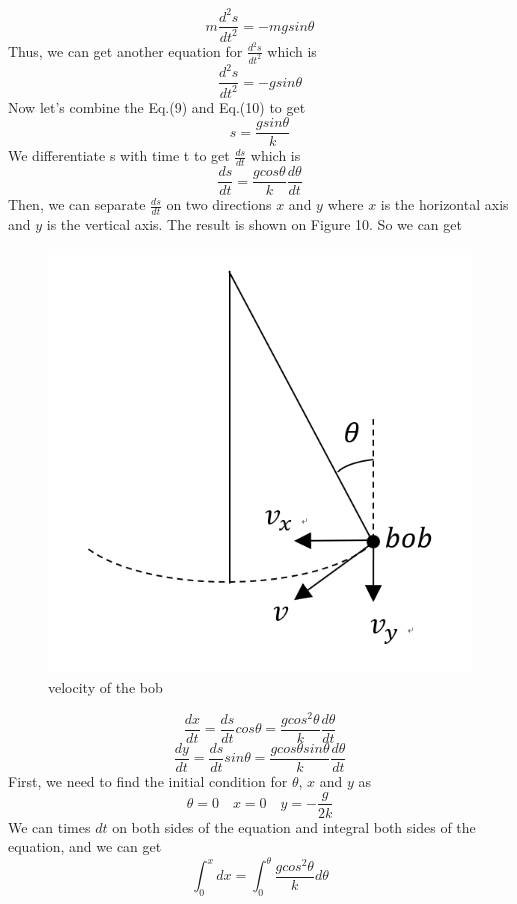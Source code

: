 \documentclass[12pt,a4paper]{article}
\begin{document}
$$m\frac{d^2s}{dt^2} = -mgsin\theta$$
Thus, we can get another equation for $\frac{d^2s}{dt^2}$ which is
\begin{equation}
    \frac{d^2s}{dt^2} = -gsin\theta
\end{equation}
Now let's combine the Eq.(9) and Eq.(10) to get
$$s = \frac{gsin\theta}{k}$$
We differentiate s with time t to get $\frac{ds}{dt}$ which is
$$\frac{ds}{dt} = \frac{gcos\theta}{k}\frac{d\theta}{dt}$$
Then, we can separate $\frac{ds}{dt}$ on two directions $x$ and $y$ where $x$ is the horizontal axis and $y$ is the vertical axis. The result is shown on Figure 10. So we can get
\begin{figure}[!htbp]
    \centering
    \includegraphics[scale=0.35]{2.png}
    \caption{velocity of the bob}
    \label{velocity}
\end{figure}
$$\frac{dx}{dt} = \frac{ds}{dt}cos\theta = \frac{gcos^2\theta}{k}\frac{d\theta}{dt}$$
$$\frac{dy}{dt} = \frac{ds}{dt}sin\theta = \frac{gcos\theta{sin}\theta}{k}\frac{d\theta}{dt}$$
First, we need to find the initial condition for $\theta$, $x$ and $y$ as 
$$\theta = 0 \quad x = 0 \quad y = -\frac{g}{2k}$$
We can times $dt$ on both sides of the equation and integral both sides of the equation, and we can get
\begin{equation}
    \int_0^xdx = \int_0^{\theta}\frac{gcos^2\theta}{k}d\theta
\end{equation}
\end{document}
